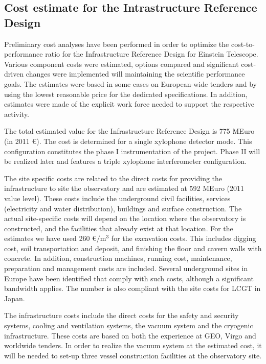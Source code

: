 \FloatBarrier
\subsection{Cost estimate for the Intrastructure Reference Design}

Preliminary cost analyses have been performed in order to optimize the cost-to-performance ratio for the Infrastructure Reference Design for Einstein Telescope. Various component costs were estimated, options compared and significant cost-driven changes were implemented will maintaining the scientific performance goals. The estimates were based in some cases on European-wide tenders and by using the lowest reasonable price for the dedicated specifications. In addition, estimates were made of the explicit work force needed to support the respective activity.

The total estimated value for the Infrastructure Reference Design is 775 MEuro (in 2011 \euro). The cost is determined for a single xylophone detector mode. This configuration constitutes the phase I instrumentation of the project. Phase II will be realized later and features a triple xylophone interferometer configuration.

The site specific costs are related to the direct costs for providing the infrastructure to site the observatory and are estimated at 592 MEuro (2011 value level). These costs include the underground civil facilities, services (electricity and water distribution), buildings and surface construction. The actual site-specific costs will depend on the location where the observatory is constructed, and the facilities that already exist at that location. For the estimates we have used 260 \euro $/ \mathrm{m^3}$ for the excavation costs. This includes digging cost, soil transportation and deposit, and finishing the floor and cavern walls with concrete. In addition, construction machines, running cost, maintenance, preparation and management costs are included. Several underground sites in Europe have been identified that comply with such costs, although a significant bandwidth applies. The number is also compliant with the site costs for LCGT in Japan.

The infrastructure costs include the direct costs for the safety and security systems, cooling and ventilation systems, the vacuum system and the cryogenic infrastructure. These costs are based on both the experience at GEO, Virgo and worldwide tenders. In order to realize the vacuum system at the estimated cost, it will be needed to set-up three vessel construction facilities at the observatory site.
 



